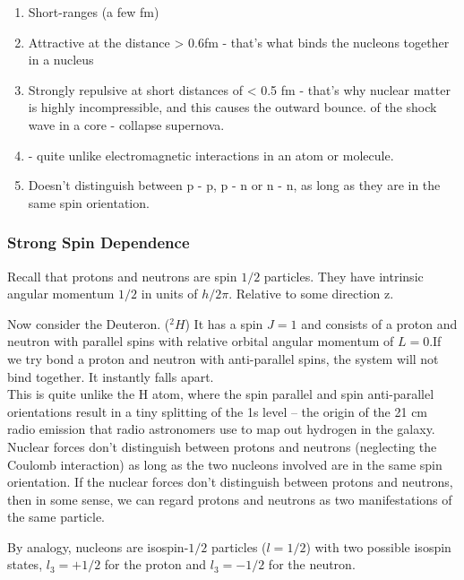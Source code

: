 \documentclass[english, 11pt]{article}
\begin{document}
\begin{enumerate}
  \item Short-ranges (a few fm)
  \item Attractive at the distance > 0.6fm - that's what binds the nucleons together in a nucleus
  \item Strongly repulsive at short distances of < 0.5 fm - that's why nuclear matter is highly incompressible, and this causes the outward bounce. of the shock wave in a core - collapse supernova.
  \item {} - quite unlike electromagnetic interactions in an atom or molecule.
  \item Doesn't distinguish between p - p, p - n or n - n, as long as they are in the same spin orientation.
\end{enumerate}

\subsubsection{Strong Spin Dependence}\label{ssd}

Recall that protons and neutrons are spin $1/2$ particles. They have intrinsic angular momentum $1/2$ in units of $h / 2 \pi$. Relative to some direction z.

Now consider the Deuteron. ($^2H$) It has a spin $J=1$ and consists of a proton and neutron with parallel spins with relative orbital angular momentum of $L=0$.If we try bond a proton and neutron with anti-parallel spins, the system will not bind together. It instantly falls apart.\\
This is quite unlike the H atom, where the spin parallel and spin anti-parallel orientations result in a tiny splitting of the 1s level -- the origin of the 21 cm radio emission that radio astronomers use to map out hydrogen in the galaxy.\\
Nuclear forces don't distinguish between protons and neutrons (neglecting the Coulomb interaction) as long as the two nucleons involved are in the same spin orientation. If the nuclear forces don't distinguish between protons and neutrons, then in some sense, we can regard protons and neutrons as two manifestations of the same particle.

\begin{defn}\label{isospin}
  By analogy, nucleons are isospin-$1/2$ particles ($l=1/2$) with two possible isospin states, $l_3=+1/2$ for the proton and $l_3 = -1/2$ for the neutron.
\end{defn}
\end{document}
